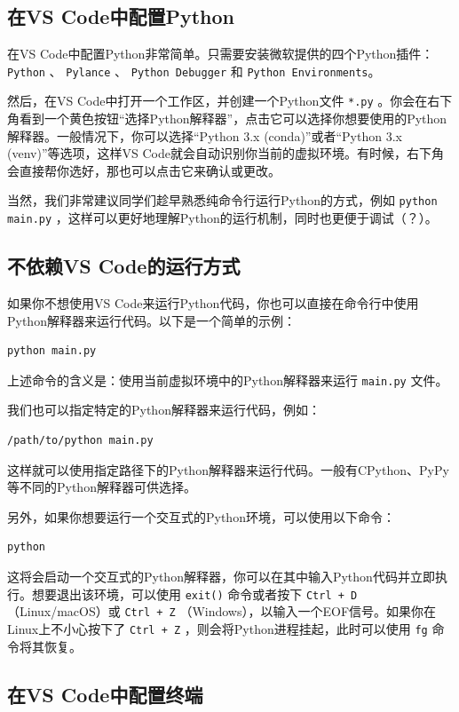 \subsection{在VS Code中配置Python}

在VS Code中配置Python非常简单。只需要安装微软提供的四个Python插件： \texttt{Python} 、 \texttt{Pylance} 、 \texttt{Python Debugger} 和 \texttt{Python Environments}。

然后，在VS Code中打开一个工作区，并创建一个Python文件 \texttt{*.py} 。你会在右下角看到一个黄色按钮“选择Python解释器”，点击它可以选择你想要使用的Python解释器。一般情况下，你可以选择“Python 3.x (conda)”或者“Python 3.x (venv)”等选项，这样VS Code就会自动识别你当前的虚拟环境。有时候，右下角会直接帮你选好，那也可以点击它来确认或更改。

当然，我们非常建议同学们趁早熟悉纯命令行运行Python的方式，例如 \texttt{python main.py} ，这样可以更好地理解Python的运行机制，同时也更便于调试（？）。

\subsection{不依赖VS Code的运行方式}

如果你不想使用VS Code来运行Python代码，你也可以直接在命令行中使用Python解释器来运行代码。以下是一个简单的示例：
\begin{verbatim}
python main.py
\end{verbatim}
上述命令的含义是：使用当前虚拟环境中的Python解释器来运行 \texttt{main.py} 文件。

我们也可以指定特定的Python解释器来运行代码，例如：
\begin{verbatim}
/path/to/python main.py
\end{verbatim}
这样就可以使用指定路径下的Python解释器来运行代码。一般有CPython、PyPy等不同的Python解释器可供选择。

另外，如果你想要运行一个交互式的Python环境，可以使用以下命令：
\begin{verbatim}
python
\end{verbatim}
这将会启动一个交互式的Python解释器，你可以在其中输入Python代码并立即执行。想要退出该环境，可以使用 \texttt{exit()} 命令或者按下 \texttt{Ctrl + D} （Linux/macOS）或 \texttt{Ctrl + Z} （Windows），以输入一个EOF信号。如果你在Linux上不小心按下了 \texttt{Ctrl + Z} ，则会将Python进程挂起，此时可以使用 \texttt{fg} 命令将其恢复。

\subsection{在VS Code中配置终端}

